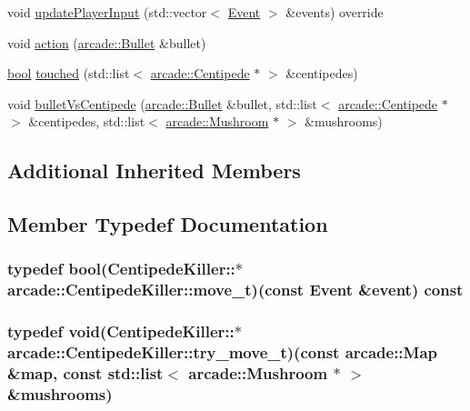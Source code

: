 \begin{DoxyCompactItemize}
\item 
void \hyperlink{classarcade_1_1_centipede_killer_a34c73ec300bff3589353be22a9e543c8}{update\-Player\-Input} (std\-::vector$<$ \hyperlink{structarcade_1_1_event}{Event} $>$ \&events) override
\item 
void \hyperlink{classarcade_1_1_centipede_killer_ae572d09c02cea160d898e9c2ca2be587}{action} (\hyperlink{classarcade_1_1_bullet}{arcade\-::\-Bullet} \&bullet)
\item 
\hyperlink{term__entry_8h_a002004ba5d663f149f6c38064926abac}{bool} \hyperlink{classarcade_1_1_centipede_killer_a21f2ad391e0e043d36306d68a969463d}{touched} (std\-::list$<$ \hyperlink{classarcade_1_1_centipede}{arcade\-::\-Centipede} $\ast$ $>$ \&centipedes)
\item 
void \hyperlink{classarcade_1_1_centipede_killer_adff69d39922286a8dc1de0b2b5fd9be0}{bullet\-Vs\-Centipede} (\hyperlink{classarcade_1_1_bullet}{arcade\-::\-Bullet} \&bullet, std\-::list$<$ \hyperlink{classarcade_1_1_centipede}{arcade\-::\-Centipede} $\ast$ $>$ \&centipedes, std\-::list$<$ \hyperlink{classarcade_1_1_mushroom}{arcade\-::\-Mushroom} $\ast$ $>$ \&mushrooms)
\end{DoxyCompactItemize}
\subsection*{Additional Inherited Members}


\subsection{Member Typedef Documentation}
\hypertarget{classarcade_1_1_centipede_killer_af8732a0ce12bf98ada3fcdb0f6884b0c}{
\subsubsection[{move\-\_\-t}]{\setlength{\rightskip}{0pt plus 5cm}typedef {\bf bool}(Centipede\-Killer\-::$\ast$ arcade\-::\-Centipede\-Killer\-::move\-\_\-t)({\bf const} {\bf Event} \&event) {\bf const} }}\label{classarcade_1_1_centipede_killer_af8732a0ce12bf98ada3fcdb0f6884b0c}
\hypertarget{classarcade_1_1_centipede_killer_aeacd04a3942b4c061bc80b0a2f52d75b}{
\subsubsection[{try\-\_\-move\-\_\-t}]{\setlength{\rightskip}{0pt plus 5cm}typedef void(Centipede\-Killer\-::$\ast$ arcade\-::\-Centipede\-Killer\-::try\-\_\-move\-\_\-t)({\bf const} {\bf arcade\-::\-Map} \&map, {\bf const} std\-::list$<$ {\bf arcade\-::\-Mushroom} $\ast$ $>$ \&mushrooms)}}\label{classarcade_1_1_centipede_killer_aeacd04a3942b4c061bc80b0a2f52d75b}


